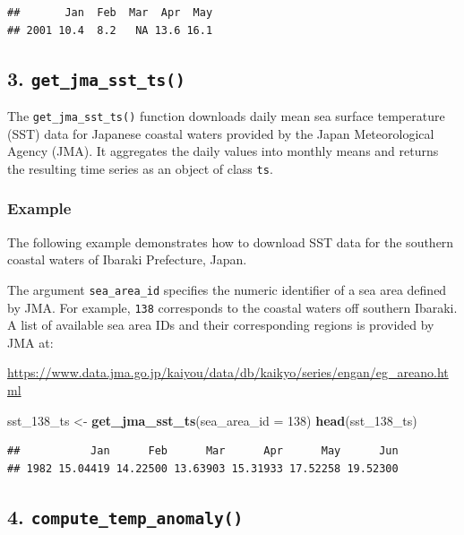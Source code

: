 \documentclass[
]{article}
\newenvironment{Shaded}{\begin{snugshade}}{\end{snugshade}}
\newcommand{\AttributeTok}[1]{\textcolor[rgb]{0.13,0.29,0.53}{#1}}
\newcommand{\DecValTok}[1]{\textcolor[rgb]{0.00,0.00,0.81}{#1}}
\newcommand{\FunctionTok}[1]{\textcolor[rgb]{0.13,0.29,0.53}{\textbf{#1}}}
\newcommand{\NormalTok}[1]{#1}
\newcommand{\OtherTok}[1]{\textcolor[rgb]{0.56,0.35,0.01}{#1}}
\begin{document}
\begin{verbatim}
##       Jan  Feb  Mar  Apr  May
## 2001 10.4  8.2   NA 13.6 16.1
\end{verbatim}

\subsection{\texorpdfstring{3.
\texttt{get\_jma\_sst\_ts()}}{3. get\_jma\_sst\_ts()}}\label{get_jma_sst_ts}

The \texttt{get\_jma\_sst\_ts()} function downloads daily mean sea
surface temperature (SST) data for Japanese coastal waters provided by
the Japan Meteorological Agency (JMA). It aggregates the daily values
into monthly means and returns the resulting time series as an object of
class \texttt{ts}.

\subsubsection{Example}\label{example-2}

The following example demonstrates how to download SST data for the
southern coastal waters of Ibaraki Prefecture, Japan.

The argument \texttt{sea\_area\_id} specifies the numeric identifier of
a sea area defined by JMA. For example, \texttt{138} corresponds to the
coastal waters off southern Ibaraki. A list of available sea area IDs
and their corresponding regions is provided by JMA at:

\url{https://www.data.jma.go.jp/kaiyou/data/db/kaikyo/series/engan/eg_areano.html}

\begin{Shaded}
\begin{Highlighting}[]
\NormalTok{sst\_138\_ts }\OtherTok{\textless{}{-}} \FunctionTok{get\_jma\_sst\_ts}\NormalTok{(}\AttributeTok{sea\_area\_id =} \DecValTok{138}\NormalTok{)}
\FunctionTok{head}\NormalTok{(sst\_138\_ts)}
\end{Highlighting}
\end{Shaded}

\begin{verbatim}
##           Jan      Feb      Mar      Apr      May      Jun
## 1982 15.04419 14.22500 13.63903 15.31933 17.52258 19.52300
\end{verbatim}

\subsection{\texorpdfstring{4.
\texttt{compute\_temp\_anomaly()}}{4. compute\_temp\_anomaly()}}\label{compute_temp_anomaly}
\end{document}
